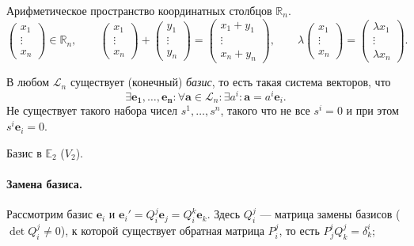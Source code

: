 \begin{example}
  Арифметическое пространство координатных столбцов $\mathbb{R}_n$.
  \[
    \begin{pmatrix}
      x_1 \\
      \vdots \\
      x_n
    \end{pmatrix} \in \mathbb{R}_n, \qquad
    \begin{pmatrix}
      x_1 \\
      \vdots \\
      x_n
    \end{pmatrix} + \begin{pmatrix}
      y_1 \\
      \vdots \\
      y_n
    \end{pmatrix} = 
    \begin{pmatrix}
      x_1 + y_1 \\
      \vdots \\
      x_n + y_n
    \end{pmatrix}, \qquad
    \lambda \begin{pmatrix}
      x_1 \\
      \vdots \\
      x_n
      \end{pmatrix} = \begin{pmatrix} \lambda x_1 \\ \vdots \\ \lambda x_n
    \end{pmatrix}.
  \]
\end{example}

В любом $\mathcal{L}_n$ существует (конечный) \textsl{базис}, то есть такая система векторов, что
\[
  \exists \mathbf{e_1}, \dots, \mathbf{e_n}\colon \forall \mathbf{a} \in
  \mathcal L_n\colon \exists
  a^i\colon  \mathbf{a} = a^i \mathbf{e}_i.
\]
Не существует такого набора чисел $s^1, \dots, s^n$, такого что не все $s^i = 0$
и при этом $s^i \mathbf{e}_i = 0$.

\begin{example}
  Базис в $\mathbb E_2$ ($V_2$). 
\end{example}

\paragraph{Замена базиса.} Рассмотрим базис $\mathbf{e}_i$ и $\mathbf{e}_i' =
Q_i^j \mathbf{e}_j = Q^k_i \mathbf{e}_k$. Здесь $Q^j_i$ --- матрица 
замены базисов ($\det Q^j_i \neq 0$), к которой существует обратная матрица
$P^j_i$, то есть $P^i_j Q^j_k = \delta^i_k$; 

